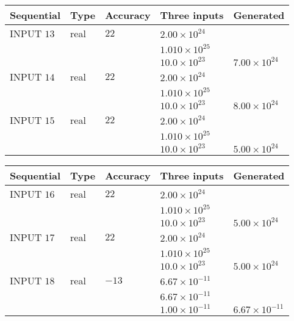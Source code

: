 \documentclass[12pt]{article}
\begin{document}
   
  
  
\noindent\begin{tabular}{|l|l|l|l|l|}
\hline
 Sequential & Type & Accuracy & Three inputs & Generated \\ 
\hline
 
 
  INPUT $          13$ & real & $          22 $ & $
 2.00 \times 10^{24}
  $ & \\
  & & &  $
 1.010 \times 10^{25}
  $ & \\
  & & &  $
 10.0 \times 10^{23}
 $ & $ 7.00 \times 10^{24} $ 
 \\  \hline  
 
 
  INPUT $          14$ & real & $          22 $ & $
 2.00 \times 10^{24}
  $ & \\
  & & &  $
 1.010 \times 10^{25}
  $ & \\
  & & &  $
 10.0 \times 10^{23}
 $ & $ 8.00 \times 10^{24} $ 
 \\  \hline  
 
 
  INPUT $          15$ & real & $          22 $ & $
 2.00 \times 10^{24}
  $ & \\
  & & &  $
 1.010 \times 10^{25}
  $ & \\
  & & &  $
 10.0 \times 10^{23}
 $ & $ 5.00 \times 10^{24} $ 
 \\  \hline  
 \end{tabular}
   
   
  
  
\noindent\begin{tabular}{|l|l|l|l|l|}
\hline
 Sequential & Type & Accuracy & Three inputs & Generated \\ 
\hline
 
 
  INPUT $          16$ & real & $          22 $ & $
 2.00 \times 10^{24}
  $ & \\
  & & &  $
 1.010 \times 10^{25}
  $ & \\
  & & &  $
 10.0 \times 10^{23}
 $ & $ 5.00 \times 10^{24} $ 
 \\  \hline  
 
 
  INPUT $          17$ & real & $          22 $ & $
 2.00 \times 10^{24}
  $ & \\
  & & &  $
 1.010 \times 10^{25}
  $ & \\
  & & &  $
 10.0 \times 10^{23}
 $ & $ 5.00 \times 10^{24} $ 
 \\  \hline  
 
 
  INPUT $          18$ & real & $         -13 $ & $
 6.67 \times 10^{-11}
  $ & \\
  & & &  $
 6.67 \times 10^{-11}
  $ & \\
  & & &  $
 1.00 \times 10^{-11}
 $ & $ 6.67 \times 10^{-11} $ 
 \\  \hline  
 \end{tabular}
   
\end{document}
